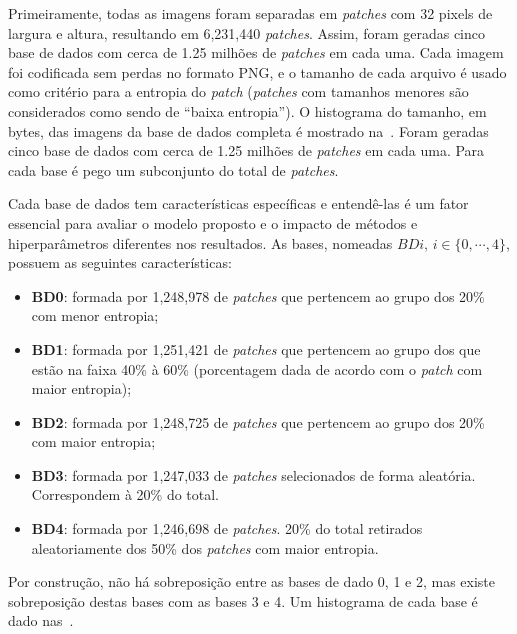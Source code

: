 Primeiramente, todas as imagens foram separadas em \textit{patches} com 32 pixels de largura e altura, resultando em 6,231,440 \textit{patches}. Assim, foram geradas cinco base de dados com cerca de 1.25 milhões de \textit{patches} em cada uma. Cada imagem foi codificada sem perdas no formato \acrshort{PNG}, e o tamanho de cada arquivo é usado como critério para a entropia do \textit{patch} (\textit{patches} com tamanhos menores são considerados como sendo de ``baixa entropia''). O histograma do tamanho, em bytes, das imagens da base de dados completa é mostrado na~.
Foram geradas cinco base de dados com cerca de 1.25 milhões de \textit{patches} em cada uma. Para cada base é pego um subconjunto do total de \textit{patches}.

Cada base de dados tem características específicas e entendê-las é um fator essencial para avaliar o modelo proposto e o impacto de métodos e hiperparâmetros diferentes nos resultados. As bases, nomeadas $BDi,\, i \in \{0,\cdots,4\}$, possuem as seguintes características:
\begin{itemize}
    \item \textbf{BD0}: formada por 1,248,978 de \textit{patches} que pertencem ao grupo dos 20\% com menor entropia;
    \item \textbf{BD1}: formada por 1,251,421 de \textit{patches} que pertencem ao grupo dos que estão na faixa 40\% à 60\% (porcentagem dada de acordo com o \textit{patch} com maior entropia);
    \item \textbf{BD2}: formada por 1,248,725 de \textit{patches} que pertencem ao grupo dos 20\% com maior entropia;
    \item \textbf{BD3}: formada por 1,247,033 de \textit{patches} selecionados de forma aleatória. Correspondem à 20\% do total.
    \item \textbf{BD4}: formada por 1,246,698 de \textit{patches}. 20\% do total retirados aleatoriamente dos 50\% dos \textit{patches} com maior entropia.
\end{itemize}
Por construção, não há sobreposição entre as bases de dado 0, 1 e 2, mas existe sobreposição destas bases com as bases 3 e 4. Um histograma de cada base é dado nas~.

